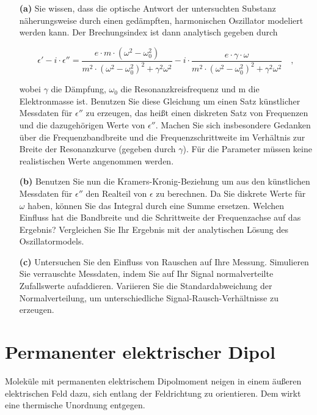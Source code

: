 \begin{itemize}

	\item[\textbf{(a)}] Sie wissen, dass die optische Antwort der untersuchten Substanz näherungsweise durch einen gedämpften, harmonischen Oszillator modeliert werden kann. Der Brechungsindex ist dann analytisch gegeben durch 
	
		$$\epsilon' - i\cdot \epsilon'' = \frac{e \cdot m \cdot (\omega^2 - \omega_0^2)}{m^2 \cdot  (\omega^2 - \omega_0^2)^2 + \gamma^2 \omega^2} - i \cdot \frac{e \cdot \gamma \cdot \omega}{m^2 \cdot  (\omega^2 - \omega_0^2)^2 + \gamma^2 \omega^2}\quad,$$

	wobei $\gamma$ die Dämpfung, $\omega_0$ die Resonanzkreisfrequenz und m die Elektronmasse ist. Benutzen Sie diese Gleichung um einen Satz künstlicher Messdaten für $\epsilon''$ zu erzeugen, das heißt einen diskreten Satz von Frequenzen und die dazugehörigen Werte von $\epsilon''$. Machen Sie sich insbesondere Gedanken über die Frequenzbandbreite und die Frequenzschrittweite im Verhältnis zur Breite der Resonanzkurve (gegeben durch $\gamma$). Für die Parameter müssen keine realistischen Werte angenommen werden.
	
	\item[\textbf{(b)}] Benutzen Sie nun die Kramers-Kronig-Beziehung um aus den künstlichen Messdaten für $\epsilon''$ den Realteil von $\epsilon$ zu berechnen. Da Sie diskrete Werte für $\omega$ haben, können Sie das Integral durch eine Summe ersetzen. Welchen Einfluss hat die Bandbreite und die Schrittweite der Frequenzachse auf das Ergebnis? Vergleichen Sie Ihr Ergebnis mit der analytischen Lösung des Oszillatormodels. 
	
	\item[\textbf{(c)}] Untersuchen Sie den Einfluss von Rauschen auf Ihre Messung. Simulieren Sie verrauschte Messdaten, indem Sie auf Ihr Signal normalverteilte Zufallswerte aufaddieren. Variieren Sie die Standardabweichung der Normalverteilung, um unterschiedliche Signal-Rausch-Verhältnisse zu erzeugen. 
	
\end{itemize}



\section{Permanenter elektrischer Dipol}


Moleküle mit permanenten elektrischem Dipolmoment neigen in einem äußeren elektrischen Feld dazu, sich entlang der Feldrichtung zu orientieren. Dem wirkt eine thermische Unordnung entgegen. 

